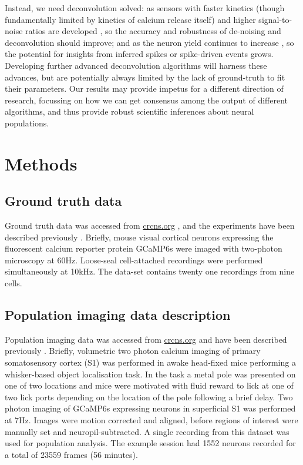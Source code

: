 \documentclass[a4paper,11pt]{article}
\begin{document}
Instead, we need deconvolution solved: as sensors with faster kinetics (though fundamentally limited by kinetics of calcium release itself) and higher signal-to-noise ratios are developed \citep{Badura2014-ub,Dana2016-yg,Dana2019-mz}, so the accuracy and robustness of de-noising and deconvolution should improve; and as the neuron yield continues to increase \citep{Stringer2019-ze,Ahrens2013-wm}, so the potential for insights from inferred spikes or spike-driven events grows. Developing further advanced deconvolution algorithms will harness these advances, but are potentially always limited by the lack of ground-truth to fit their parameters. Our results may provide impetus for a different direction of research, focussing on how we can get consensus among the output of different algorithms, and thus provide robust scientific inferences about neural populations.

\clearpage
\section{Methods}
\subsection*{Ground truth data}
Ground truth data was accessed from \href{http://crcns.org/data-sets/methods/cai-1}{crcns.org} \citep{Svoboda2015-ym}, and the experiments have been described previously \citep{Chen2013-nv}. Briefly, mouse visual cortical neurons expressing the fluorescent calcium reporter protein GCaMP6s were imaged with two-photon microscopy at 60Hz. Loose-seal cell-attached recordings were performed simultaneously at 10kHz. The data-set contains twenty one recordings from nine cells.


\subsection*{Population imaging data description}
Population imaging data was accessed from \href{https://crcns.org/data-sets/ssc/ssc-2}{crcns.org} and have been described previously \citep{Peron2015-kd}. Briefly, volumetric two photon calcium imaging of primary somatosensory cortex (S1) was performed in awake head-fixed mice performing a whisker-based object localisation task. In the task a metal pole was presented on one of two locations and mice were motivated with fluid reward to lick at one of two lick ports depending on the location of the pole following a brief delay. Two photon imaging of GCaMP6s expressing neurons in superficial S1 was performed at 7Hz. Images were motion corrected and aligned, before regions of interest were manually set and neuropil-subtracted. A single recording from this dataset was used for population analysis. The example session had 1552 neurons recorded for a total of 23559 frames (56 minutes).
\end{document}
